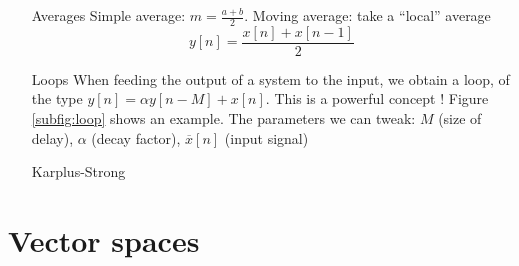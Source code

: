 \documentclass[11pt,a4paper]{article}
\begin{document}
\begin{itemize}[font=\bfseries\uline]
    \item[Averages] Simple average: $m = \frac{a+b}{2}$. Moving average: take a ``local'' average 
        \begin{equation}
            y[n] = \frac{x[n] + x[n-1]}{2}
        \end{equation}
    \item[Loops]When feeding the output of a system to the input, we obtain a loop, of the type $y[n] = \alpha y[n-M] + x[n]$. This is a powerful concept ! Figure \ref{subfig:loop} shows an example. The parameters we can tweak: $M$ (size of delay), $\alpha$ (decay factor), $\overline{x}[n]$ (input signal)     
    \item[Karplus-Strong]\todo{}
\end{itemize}
\section{Vector spaces}
\end{document}

